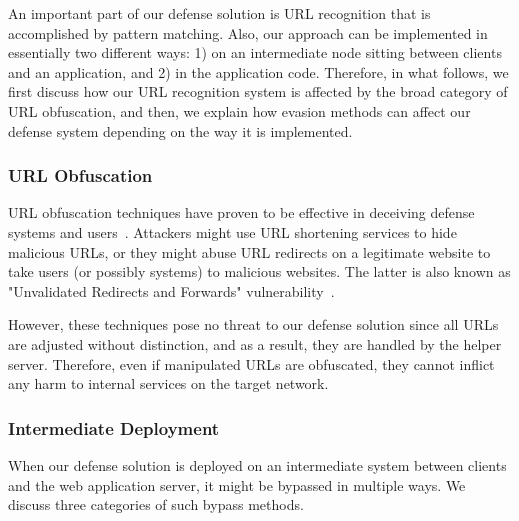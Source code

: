 An important part of our defense solution is URL recognition that is accomplished by pattern matching. Also, our approach can be implemented in essentially two different ways: 1) on an intermediate node sitting between clients and an application, and 2) in the application code. Therefore, in what follows, we first discuss how our URL recognition system is affected by the broad category of URL obfuscation, and then, we explain how evasion methods can affect our defense system depending on the way it is implemented.

\subsubsection{URL Obfuscation}
URL obfuscation techniques have proven to be effective in deceiving defense systems and users~\cite{url-obfuscation}. Attackers might use URL shortening services to hide malicious URLs, or they might abuse URL redirects on a legitimate website to take users (or possibly systems) to malicious websites. The latter is also known as "Unvalidated Redirects and Forwards" vulnerability~\cite{open-redirect}.

However, these techniques pose no threat to our defense solution since all URLs are adjusted without distinction, and as a result, they are handled by the helper server. Therefore, even if manipulated URLs are obfuscated, they cannot inflict any harm to internal services on the target network.

\subsubsection{Intermediate Deployment}
When our defense solution is deployed on an intermediate system between clients and the web application server, it might be bypassed in multiple ways. We discuss three categories of such bypass methods.


